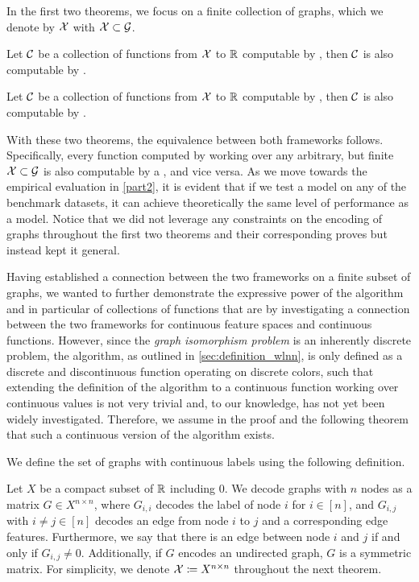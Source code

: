 In the first two theorems, we focus on a finite collection of graphs, which we denote by $\mathcal{X}$ with $\mathcal{X} \subset \mathcal{G}$.
\begin{theorem}\label{theorem:gnn_in_1wl}
    Let $\mathcal{C}$ be a collection of functions from $\mathcal{X}$ to $\mathbb{R}$ computable by \gnns, then $\mathcal{C}$ is also computable by \wlnn.
\end{theorem}

\begin{theorem}\label{theorem:1wl_in_gnn}
    Let $\mathcal{C}$ be a collection of functions from $\mathcal{X}$ to $\mathbb{R}$ computable by \wlnn, then $\mathcal{C}$ is also computable by \gnns.
\end{theorem}
With these two theorems, the equivalence between both frameworks follows. Specifically, every function computed by \wlnn working over any arbitrary, but finite $\mathcal{X} \subset \mathcal{G}$ is also computable by a \gnn, and vice versa. As we move towards the empirical evaluation in \cref{part2}, it is evident that if we test a \wlnn model on any of the benchmark datasets, it can achieve theoretically the same level of performance as a \gnn model. Notice that we did not leverage any constraints on the encoding of graphs throughout the first two theorems and their corresponding proves but instead kept it general.

Having established a connection between the two frameworks on a finite subset of graphs, we wanted to further demonstrate the expressive power of the \wl algorithm and in particular of collections of functions that are \wldisc by investigating a connection between the two frameworks for continuous feature spaces and continuous functions. However, since the \textit{graph isomorphism problem} is an inherently discrete problem, the \wl algorithm, as outlined in \cref{sec:definition_wlnn}, is only defined as a discrete and discontinuous function operating on discrete colors, such that extending the definition of the \wl algorithm to a continuous function working over continuous values is not very trivial and, to our knowledge, has not yet been widely investigated. Therefore, we assume in the proof and the following theorem that such a continuous version of the \wl algorithm exists.

We define the set of graphs with continuous labels using the following definition.
\begin{definition}
    Let $X$ be a compact subset of $\mathbb{R}$ including $0$. We decode graphs with $n$ nodes as a matrix $G \in X^{n \times n}$, where $G_{i,i}$ decodes the label of node $i$ for $i \in [n]$, and $G_{i,j}$ with $i \neq j \in [n]$ decodes an edge from node $i$ to $j$ and a corresponding edge features. Furthermore, we say that there is an edge between node $i$ and $j$ if and only if $G_{i,j} \neq 0$. Additionally, if $G$ encodes an undirected graph, $G$ is a symmetric matrix. For simplicity, we denote $\mathcal{X} \coloneqq X^{n \times n}$ throughout the next theorem.
\end{definition}

